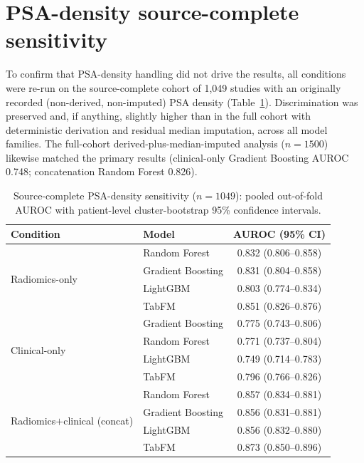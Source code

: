 \documentclass[11pt]{article}
\begin{document}
\section{PSA-density source-complete sensitivity}
\label{app:psad}

To confirm that PSA-density handling did not drive the results, all conditions
were re-run on the source-complete cohort of 1{,}049 studies with an originally
recorded (non-derived, non-imputed) PSA density (Table~\ref{tab:psad_full}).
Discrimination was preserved and, if anything, slightly higher than in the full
cohort with deterministic derivation and residual median imputation, across all
model families. The full-cohort derived-plus-median-imputed analysis ($n=1500$)
likewise matched the primary results (clinical-only Gradient Boosting AUROC 0.748;
concatenation Random Forest 0.826).

\begin{table}[htbp]
\centering
\caption{Source-complete PSA-density sensitivity ($n=1049$): pooled out-of-fold
AUROC with patient-level cluster-bootstrap 95\% confidence intervals.}
\label{tab:psad_full}
\begin{tabular}{llc}
\toprule
Condition & Model & AUROC (95\% CI) \\
\midrule
\multirow{4}{*}{Radiomics-only}
 & Random Forest     & 0.832 (0.806--0.858) \\
 & Gradient Boosting & 0.831 (0.804--0.858) \\
 & LightGBM          & 0.803 (0.774--0.834) \\
 & TabFM             & 0.851 (0.826--0.876) \\
\midrule
\multirow{4}{*}{Clinical-only}
 & Gradient Boosting & 0.775 (0.743--0.806) \\
 & Random Forest     & 0.771 (0.737--0.804) \\
 & LightGBM          & 0.749 (0.714--0.783) \\
 & TabFM             & 0.796 (0.766--0.826) \\
\midrule
\multirow{4}{*}{Radiomics$+$clinical (concat)}
 & Random Forest     & 0.857 (0.834--0.881) \\
 & Gradient Boosting & 0.856 (0.831--0.881) \\
 & LightGBM          & 0.856 (0.832--0.880) \\
 & TabFM             & 0.873 (0.850--0.896) \\
\bottomrule
\end{tabular}
\end{table}
\end{document}
